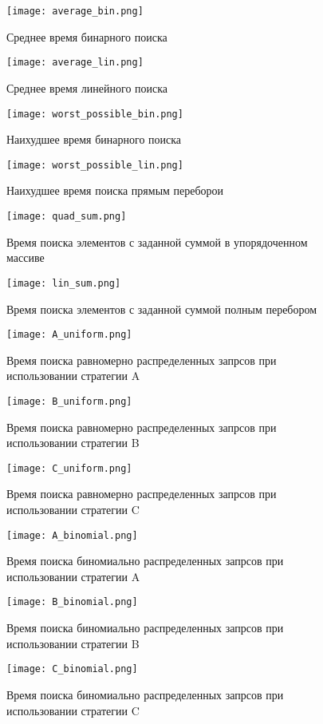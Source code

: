 \documentclass{article}
\begin{document}
\begin{figure}
\texttt{[image: average\_bin.png]}
\caption{Среднее время бинарного поиска}
\end{figure}

\begin{figure}
\texttt{[image: average\_lin.png]}
\caption{Среднее время линейного поиска}
\end{figure}

\begin{figure}
\texttt{[image: worst\_possible\_bin.png]}
\caption{Наихудшее время бинарного поиска}
\end{figure}

\begin{figure}
\texttt{[image: worst\_possible\_lin.png]}
\caption{Наихудшее время поиска прямым переборои}
\end{figure}

\begin{figure}
\texttt{[image: quad\_sum.png]}
\caption{Время поиска элементов с заданной суммой в упорядоченном массиве}
\end{figure}

\begin{figure}
\texttt{[image: lin\_sum.png]}
\caption{Время поиска элементов с заданной суммой полным перебором}
\end{figure}

\begin{figure}
\texttt{[image: A\_uniform.png]}
\caption{Время поиска равномерно распределенных запрсов при использовании стратегии A}
\end{figure}

\begin{figure}
\texttt{[image: B\_uniform.png]}
\caption{Время поиска равномерно распределенных запрсов при использовании стратегии B}
\end{figure}

\begin{figure}
\texttt{[image: C\_uniform.png]}
\caption{Время поиска равномерно распределенных запрсов при использовании стратегии C}
\end{figure}

\begin{figure}
\texttt{[image: A\_binomial.png]}
\caption{Время поиска биномиально распределенных запрсов при использовании стратегии A}
\end{figure}

\begin{figure}
\texttt{[image: B\_binomial.png]}
\caption{Время поиска биномиально распределенных запрсов при использовании стратегии B}
\end{figure}


\begin{figure}
\texttt{[image: C\_binomial.png]}
\caption{Время поиска биномиально распределенных запрсов при использовании стратегии C}
\end{figure}
\end{document}
